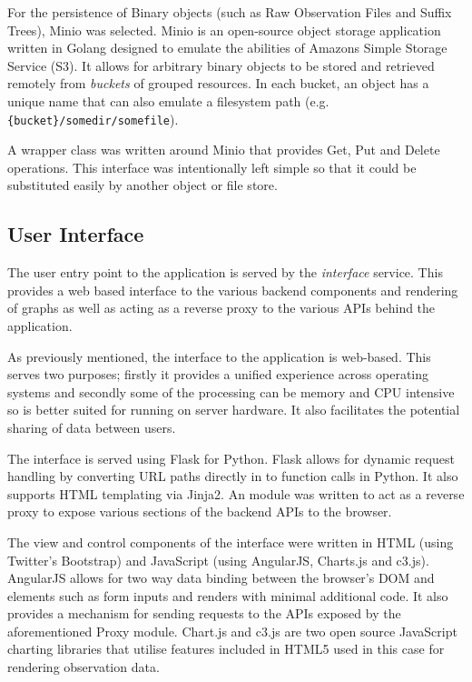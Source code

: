 \documentclass[../report.tex]{subfiles}
\begin{document}
	For the persistence of Binary objects (such as Raw Observation Files and Suffix Trees), Minio was selected.  Minio is an open-source object storage application written in Golang designed to emulate the abilities of Amazons Simple Storage Service (S3).  It allows for arbitrary binary objects to be stored and retrieved remotely from \textit{buckets} of grouped resources.  In each bucket, an object has a unique name that can also emulate a filesystem path (e.g. \texttt{\{bucket\}/somedir/somefile}).
	
	A wrapper class was written around Minio that provides Get, Put and Delete operations.  This interface was intentionally left simple so that it could be substituted easily by another object or file store.
	
\subsection{User Interface}
	The user entry point to the application is served by the \textit{interface} service.  This provides a web based interface to the various backend components and rendering of graphs as well as acting as a reverse proxy to the various APIs behind the application.
	
	As previously mentioned, the interface to the application is web-based.  This serves two purposes; firstly it provides a unified experience across operating systems and secondly some of the processing can be memory and CPU intensive so is better suited for running on server hardware.  It also facilitates the potential sharing of data between users.
	
	The interface is served using Flask for Python.  Flask allows for dynamic request handling by converting URL paths directly in to function calls in Python.  It also supports HTML templating via Jinja2.  An module was written to act as a reverse proxy to expose various sections of the backend APIs to the browser.
	
	The view and control components of the interface were written in HTML (using Twitter's Bootstrap) and JavaScript (using AngularJS, Charts.js and c3.js).  AngularJS allows for two way data binding between the browser's DOM and elements such as form inputs and renders with minimal additional code.  It also provides a mechanism for sending requests to the APIs exposed by the aforementioned Proxy module.  Chart.js and c3.js are two open source JavaScript charting libraries that utilise features included in HTML5 used in this case for rendering observation data.
\end{document}
